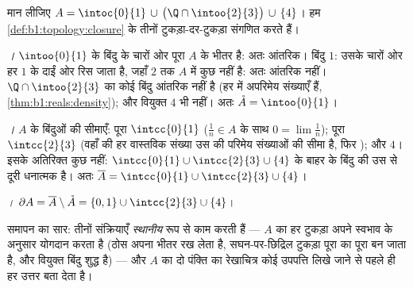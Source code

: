 \begin{example}[पूरी शल्य-रचना]\label{ex:b1:topology:anatomy}
मान लीजिए $A = \intoc{0}{1} \,\cup\, \bigl(\Q \cap \intoo{2}{3}\bigr)
\,\cup\, \{4\}$। हम \cref{def:b1:topology:closure} के तीनों 
टुकड़ा-दर-टुकड़ा संगणित करते हैं।

\emph{।} $\intoo{0}{1}$ के बिंदु के चारों ओर पूरा  $A$ के भीतर
है: अतः आंतरिक। बिंदु $1$: उसके चारों ओर हर  $1$ के दाईं ओर रिस जाता
है, जहाँ $2$ तक $A$ में कुछ नहीं है: अतः आंतरिक नहीं। $\Q \cap \intoo{2}{3}$
का कोई बिंदु आंतरिक नहीं है (हर  में अपरिमेय संख्याएँ हैं,
\cref{thm:b1:reals:density}); और वियुक्त $4$ भी नहीं। अतः $\mathring A =
\intoo{0}{1}$।

\emph{।} $A$ के बिंदुओं की सीमाएँ: पूरा $\intcc{0}{1}$ ($\frac 1n \in
A$ के साथ $0 = \lim \frac1n$); पूरा $\intcc{2}{3}$ (वहाँ की हर वास्तविक
संख्या उस  की परिमेय संख्याओं की सीमा है, फिर ); और $4$। इसके
अतिरिक्त कुछ नहीं: $\intcc{0}{1} \cup \intcc{2}{3} \cup \{4\}$ के बाहर के
बिंदु की उस  से दूरी धनात्मक है। अतः $\overline A =
\intcc{0}{1} \cup \intcc{2}{3} \cup \{4\}$।

\emph{।} $\partial A = \overline A \setminus \mathring A = \{0, 1\}
\cup \intcc{2}{3} \cup \{4\}$।

समापन का सार: तीनों संक्रियाएँ \emph{स्थानीय} रूप से काम करती हैं --- $A$ का
हर टुकड़ा अपने स्वभाव के अनुसार योगदान करता है (ठोस  अपना भीतर रख लेता
है, सघन-पर-छिद्रिल टुकड़ा पूरा का पूरा  बन जाता है, और वियुक्त बिंदु
शुद्ध  है) --- और $A$ का दो पंक्ति का रेखाचित्र कोई उपपत्ति लिखे जाने
से पहले ही हर उत्तर बता देता है।
\end{example}

